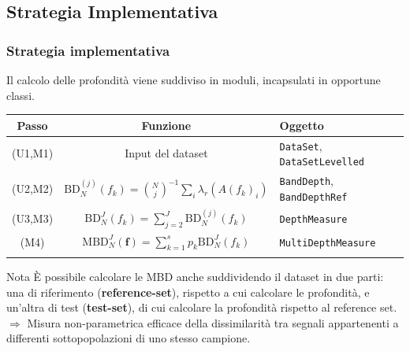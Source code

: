 \documentclass[9pt]{beamer}
\begin{document}
\subsection{Strategia Implementativa}
\begin{frame}
 \frametitle{Strategia implementativa}

Il calcolo delle profondit\`a viene suddiviso in moduli, incapsulati in opportune classi.\\
\medskip

 \begin{tabular}{c c l}
\toprule
 \textbf{Passo} & \textbf{Funzione} & \textbf{Oggetto}\\
\midrule
\bigskip
 (U1,M1) & Input del dataset & \texttt{DataSet}, \texttt{DataSetLevelled}\\
\bigskip
 (U2,M2) & $\text{BD}^{(j)}_N(f_k) = {N \choose j}^{-1} \sum_{i} \lambda_r \left( A(f_k)_i \right)$ & \texttt{BandDepth}, \texttt{BandDepthRef}\\
\bigskip
 (U3,M3) & $\text{BD}^J_N\left( f_k \right) = \sum_{j=2}^J \text{BD}^{(j)}_N\left(f_k \right) $ & \texttt{DepthMeasure}\\ 
(M4) & $\text{MBD}^J_N\left( \mathbf{f} \right) = \sum_{k=1}^s p_k \text{BD}^{J}_N   \left(f_{k}\right)$ & \texttt{MultiDepthMeasure}\\
\bottomrule 
\smallskip
\end{tabular}

\begin{block}{Nota}
\`E possibile calcolare le MBD anche suddividendo il dataset in due parti: una di riferimento (\textbf{reference-set}), rispetto a cui 
calcolare le profondità, e un’altra di test (\textbf{test-set}), di cui calcolare la profondità rispetto al reference set.\\
\medskip
$\Longrightarrow$   Misura non-parametrica efficace della dissimilarità tra segnali appartenenti a differenti sottopopolazioni di uno stesso campione.
\end{block}


\end{frame}


\end{document}
